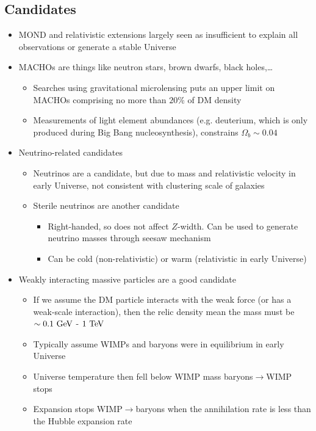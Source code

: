 \subsection{Candidates}
\begin{itemize}
  \item MOND and relativistic extensions largely seen as insufficient to explain all observations or generate a stable Universe
  \item MACHOs are things like neutron stars, brown dwarfs, black holes,\dots
  \begin{itemize}
    \item Searches using gravitational microlensing puts an upper limit on MACHOs comprising no more than $20\%$ of DM density
    \item Measurements of light element abundances (e.g. deuterium, which is only produced during Big Bang nucleosynthesis), constrains $\Omega_b \sim 0.04$
  \end{itemize}
  \item Neutrino-related candidates
  \begin{itemize}
    \item Neutrinos are a candidate, but due to mass and relativistic velocity in early Universe, not consistent with clustering scale of galaxies
    \item Sterile neutrinos are another candidate
    \begin{itemize}
      \item Right-handed, so does not affect $Z$-width. Can be used to generate neutrino masses through seesaw mechanism
      \item Can be cold (non-relativistic) or warm (relativistic in early Universe)
    \end{itemize}
  \end{itemize}
  \item Weakly interacting massive particles are a good candidate
  \begin{itemize}
    \item If we assume the DM particle interacts with the weak force (or has a weak-scale interaction), then the relic density mean the mass must be $\sim 0.1~\text{GeV}$ - $1~\text{TeV}$
    \item Typically assume WIMPs and baryons were in equilibrium in early Universe
    \item Universe temperature then fell below WIMP mass \thus baryons$\rightarrow$WIMP stops
    \item Expansion stops WIMP$\rightarrow$baryons when the annihilation rate is less than the Hubble expansion rate

\end{itemize}
\end{itemize}
